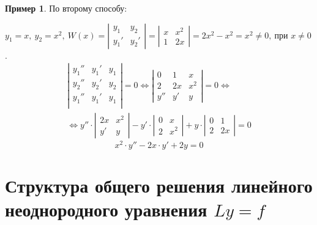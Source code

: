 \documentclass[11pt,a4paper,oneside]{report}
\theoremstyle{definition}
\newtheorem{example}{Пример}
\theoremstyle{plain}
\theoremstyle{remark}
\begin{document}
\begin{example}
    По второму способу:

    $y_1 = x, \ y_2 = x^2, \ W(x) = \left|\begin{array}{cc}
            y_1 & y_2 \\ y_1' & y_2'
        \end{array}\right| = \left|\begin{array}{cc}
            x & x^2 \\ 1 & 2x
        \end{array}\right| = 2x^2 - x^2 = x^2 \ne 0, \ \text{при } x\ne 0$.
    \begin{multline*}
        \left|\begin{array}{ccc}
            y_1'' & y_1' & y_1 \\
            y_2'' & y_2' & y_2 \\
            y_1'' & y_1' & y_1 \\
        \end{array}\right| = 0 \iff \left|\begin{array}{ccc}
            0   & 1  & x   \\
            2   & 2x & x^2 \\
            y'' & y' & y
        \end{array}\right| = 0 \iff \\
        \iff y'' \cdot \left|\begin{array}{cc}
            2x & x^2 \\ y' & y
        \end{array}\right| - y' \cdot \left|\begin{array}{cc}
            0 & x \\ 2 & x^2
        \end{array}\right| + y \cdot \left|\begin{array}{cc}
            0 & 1 \\ 2 & 2x
        \end{array}\right| = 0
    \end{multline*}
    \begin{equation*}
        x^2 \cdot y'' - 2x \cdot y' + 2y = 0
    \end{equation*}
\end{example}

\section{Структура общего решения линейного неоднородного уравнения $Ly = f$}
\end{document}
